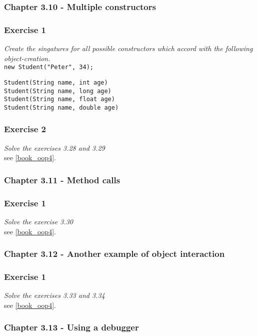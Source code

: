 \subsubsection{Chapter 3.10 - Multiple constructors}

\subsubsection*{Exercise 1}
\textit{Create the singatures for all possible constructors which accord
with the following object-creation.}\\
\lstinline{new Student("Peter", 34);}
\begin{lstlisting}
Student(String name, int age)
Student(String name, long age)
Student(String name, float age)
Student(String name, double age)
\end{lstlisting}

\subsubsection*{Exercise 2}
\textit{Solve the exercises 3.28 and 3.29}\\
see \ref{book_oop4}. 

\subsubsection{Chapter 3.11 - Method calls}

\subsubsection*{Exercise 1}
\textit{Solve the exercise 3.30}\\
see \ref{book_oop4}. 

\subsubsection{Chapter 3.12 - Another example of object interaction}

\subsubsection*{Exercise 1}
\textit{Solve the exercises 3.33 and 3.34}\\
see \ref{book_oop4}. 

\subsubsection{Chapter 3.13 - Using a debugger}

